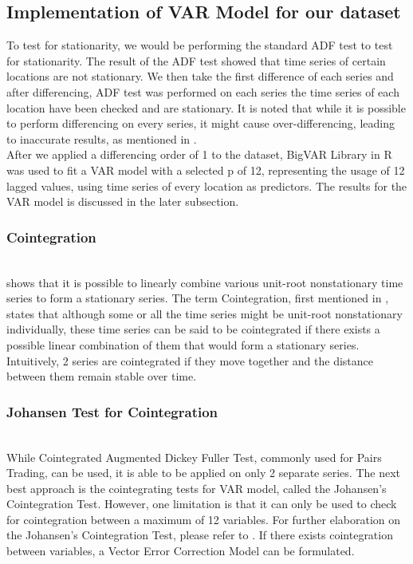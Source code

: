 \documentclass[nonblindrev,msom]{informs3} %
\begin{document}
\subsection{Implementation of VAR Model for our dataset}

To test for stationarity, we would be performing the standard ADF test to test for stationarity. The result of the ADF test showed that time series of certain locations are not stationary. We then take the first difference of each series and after differencing, ADF test was performed on each series the time series of each location have been checked and are stationary. It is noted that while it is possible to perform differencing on every series, it might cause over-differencing, leading to inaccurate results, as mentioned in \cite{Ruey2014}. \\

\noindent After we applied a differencing order of 1 to the dataset, BigVAR Library in R was used to fit a VAR model with a selected p of 12, representing the usage of 12 lagged values, using time series of every location as predictors. The results for the VAR model is discussed in the later subsection. 


\subsubsection{Cointegration}
\hfill\\
\cite{Box1977} shows that it is possible to linearly combine various unit-root nonstationary time series to form a stationary series. The term Cointegration, first mentioned in \cite{Granger1983}, states that although some or all the time series might be unit-root nonstationary individually, these time series can be said to be cointegrated if there exists a possible linear combination of them that would form a stationary series. Intuitively, 2 series are cointegrated if they move together and the distance between them remain stable over time. 

\subsubsection{Johansen Test for Cointegration}
\hfill\\
While Cointegrated Augmented Dickey Fuller Test, commonly used for Pairs Trading, can be used, it is able to be applied on only 2 separate series. The next best approach is the cointegrating tests for VAR model, called the Johansen's Cointegration Test. However, one limitation is that it can only be used to check for cointegration between a maximum of 12 variables. For further elaboration on the Johansen's Cointegration Test, please refer to \cite{Johansen1991}. If there exists cointegration between variables, a Vector Error Correction Model can be formulated. \\
\end{document}

